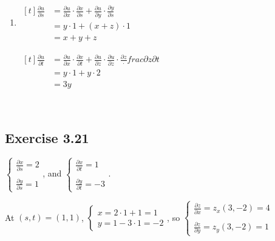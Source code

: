 \documentclass[11pt,fleqn]{book} %
\begin{document}
\begin{enumerate}
    \item $\begin{aligned}[t]
        \frac{\partial u}{\partial s} 
         & = \frac{\partial u}{\partial x} \cdot \frac{\partial x}{\partial s} + \frac{\partial u}{\partial y} \cdot \frac{\partial y}{\partial s} \\
         & = y \cdot 1 + (x + z) \cdot 1 \\
         & = x + y + z
    \end{aligned}$
    \qquad\qquad
    \begin{minipage}[t]{0.45\linewidth}
        $\begin{aligned}[t]
            \frac{\partial u}{\partial t} 
             & = \frac{\partial u}{\partial x} \cdot \frac{\partial x}{\partial t} + \frac{\partial u}{\partial z} \cdot \frac{\partial u}{\partial z} \cdot \frac{\partial z} \cdot frac{\partial z}{\partial t} \\
             & = y \cdot 1 + y \cdot 2 \\
             & = 3y
        \end{aligned}$
    \end{minipage}
\end{enumerate}

{~~~}

\subsection*{Exercise 3.21}

$\begin{cases}
    \frac{\partial x}{\partial s} = 2 \\ \\
    \frac{\partial y}{\partial s} = 1
\end{cases}$, and $\begin{cases}
    \frac{\partial x}{\partial t} = 1 \\ \\
    \frac{\partial y}{\partial t} = -3
\end{cases}$. 

At $(s, t) = (1, 1)$, $\begin{cases} x = 2 \cdot 1 + 1 = 1 \\ y = 1 - 3 \cdot 1 = -2 \end{cases}$, so $\begin{cases}
    \frac{\partial z}{\partial x} = z_x(3, -2) = 4 \\ \\ 
    \frac{\partial z}{\partial y} = z_y(3, -2) = 1 
\end{cases}$
\end{document}
